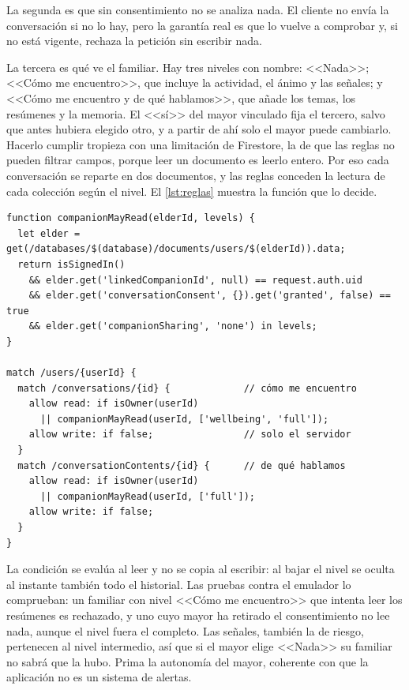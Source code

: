 La segunda es que sin consentimiento no se analiza nada. El cliente no envía la conversación si no lo hay, pero la garantía real es que  lo vuelve a comprobar y, si no está vigente, rechaza la petición sin escribir nada.

La tercera es qué ve el familiar. Hay tres niveles con nombre: <<Nada>>; <<Cómo me encuentro>>, que incluye la actividad, el ánimo y las señales; y <<Cómo me encuentro y de qué hablamos>>, que añade los temas, los resúmenes y la memoria. El <<sí>> del mayor vinculado fija el tercero, salvo que antes hubiera elegido otro, y a partir de ahí solo el mayor puede cambiarlo. Hacerlo cumplir tropieza con una limitación de Firestore, la de que las reglas no pueden filtrar campos, porque leer un documento es leerlo entero. Por eso cada conversación se reparte en dos documentos, y las reglas conceden la lectura de cada colección según el nivel. El \autoref{lst:reglas} muestra la función que lo decide.

\begin{lstlisting}[float=tbp, caption={Regla de lectura del familiar sobre el análisis del mayor (extracto de \texttt{firestore.rules}).}, label={lst:reglas}]
function companionMayRead(elderId, levels) {
  let elder = get(/databases/$(database)/documents/users/$(elderId)).data;
  return isSignedIn()
    && elder.get('linkedCompanionId', null) == request.auth.uid
    && elder.get('conversationConsent', {}).get('granted', false) == true
    && elder.get('companionSharing', 'none') in levels;
}

match /users/{userId} {
  match /conversations/{id} {             // cómo me encuentro
    allow read: if isOwner(userId)
      || companionMayRead(userId, ['wellbeing', 'full']);
    allow write: if false;                // solo el servidor
  }
  match /conversationContents/{id} {      // de qué hablamos
    allow read: if isOwner(userId)
      || companionMayRead(userId, ['full']);
    allow write: if false;
  }
}
\end{lstlisting}

La condición se evalúa al leer y no se copia al escribir: al bajar el nivel se oculta al instante también todo el historial. Las pruebas contra el emulador lo comprueban: un familiar con nivel <<Cómo me encuentro>> que intenta leer los resúmenes es rechazado, y uno cuyo mayor ha retirado el consentimiento no lee nada, aunque el nivel fuera el completo. Las señales, también la de riesgo, pertenecen al nivel intermedio, así que si el mayor elige <<Nada>> su familiar no sabrá que la hubo. Prima la autonomía del mayor, coherente con que la aplicación no es un sistema de alertas.

